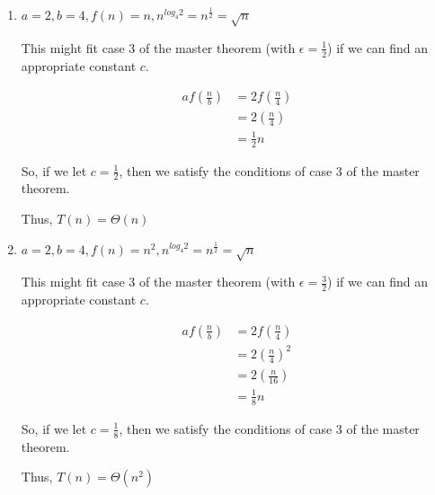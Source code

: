 \documentclass[12pt,letterpaper]{article}
\begin{document}
\begin{enumerate}
\begin{enumerate}
        \item
          $a = 2, b = 4, f(n) = n, n^{log_4 2} = n^\frac{1}{2} = \sqrt{n}$

          This might fit case 3 of the master theorem (with $\epsilon = \frac{1}{2}$) if we can find an appropriate constant $c$.

          \begin{align*}
            af\left(\frac{n}{b}\right) &= 2f\left(\frac{n}{4}\right) \\
            &= 2\left(\frac{n}{4}\right) \\
            &= \frac{1}{2}n
          \end{align*}

          So, if we let $c = \frac{1}{2}$, then we satisfy the conditions of case 3 of the master theorem.

          Thus, $T(n) = \Theta(n)$

        \item
          $a = 2, b = 4, f(n) = n^2, n^{log_4 2} = n^\frac{1}{2} = \sqrt{n}$

          This might fit case 3 of the master theorem (with $\epsilon = \frac{3}{2}$) if we can find an appropriate constant $c$.

          \begin{align*}
            af\left(\frac{n}{b}\right) &= 2f\left(\frac{n}{4}\right) \\
            &= 2\left(\frac{n}{4}\right)^2 \\
            &= 2\left(\frac{n}{16}\right) \\
            &= \frac{1}{8}n
          \end{align*}

          So, if we let $c = \frac{1}{8}$, then we satisfy the conditions of case 3 of the master theorem.

          Thus, $T(n) = \Theta(n^2)$

      \end{enumerate}
  \end{enumerate}
\end{document}

